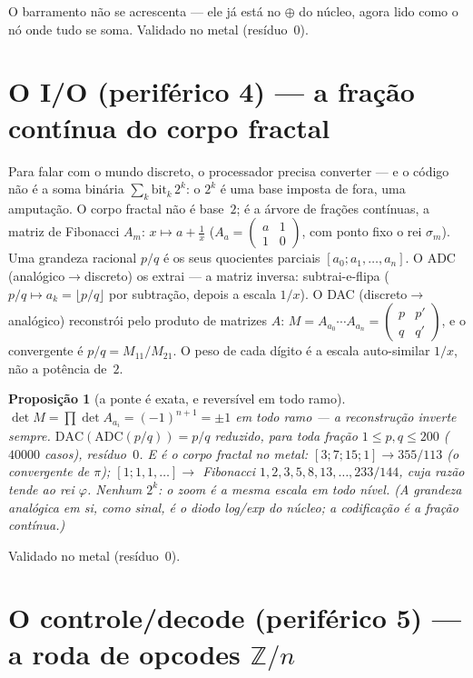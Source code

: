 \documentclass[11pt,a4paper]{article}
\newtheorem{proposicao}{Proposição}
\begin{document}
O barramento não se acrescenta --- ele já está no $\oplus$ do núcleo, agora lido como o nó onde tudo
se soma. Validado no metal (resíduo~$0$).

\section{O I/O (periférico 4) --- a fração contínua do corpo fractal}
\label{sec:io}

Para falar com o mundo discreto, o processador precisa converter --- e o código não é a soma
binária $\sum_{k}\mathrm{bit}_{k}\,2^{k}$: o $2^{k}$ é uma base imposta de fora, uma amputação. O corpo fractal não é
base~$2$; é a árvore de frações contínuas, a matriz de Fibonacci $A_{m}$: $x\mapsto a+\frac{1}{x}$
($A_{a}=\begin{pmatrix}a&1\\1&0\end{pmatrix}$, com ponto fixo o rei $\sigma_{m}$).
Uma grandeza racional $p/q$ é os seus quocientes parciais $[a_{0};a_{1},\ldots,a_{n}]$.
O ADC (analógico$\to$discreto) os extrai --- a matriz inversa: subtrai-e-flipa
($p/q\mapsto a_{k}=\lfloor p/q\rfloor$ por subtração, depois a escala $1/x$).
O DAC (discreto$\to$analógico) reconstrói pelo produto de matrizes $A$:
$M=A_{a_{0}}\cdots A_{a_{n}}=\begin{pmatrix}p&p'\\q&q'\end{pmatrix}$, e o convergente é $p/q=M_{11}/M_{21}$.
O peso de cada dígito é a escala auto-similar $1/x$, não a potência de~$2$.

\begin{proposicao}[a ponte é exata, e reversível em todo ramo]
$\det M=\prod\det A_{a_{i}}=(-1)^{n+1}=\pm 1$ em todo ramo --- a reconstrução inverte sempre.
$\mathrm{DAC}(\mathrm{ADC}(p/q))=p/q$ reduzido, para toda fração $1\le p,q\le 200$ ($40000$ casos), resíduo~$0$.
E é o corpo fractal no metal: $[3;7;15;1]\to 355/113$ (o convergente de $\pi$);
$[1;1,1,\ldots]\to$ Fibonacci $1,2,3,5,8,13,\ldots,233/144$, cuja razão tende ao rei $\varphi$.
Nenhum $2^{k}$: o zoom é a mesma escala em todo nível.
(A grandeza analógica em si, como sinal, é o diodo log/exp do núcleo; a codificação é a fração contínua.)
\end{proposicao}

Validado no metal (resíduo~$0$).

\section{O controle/decode (periférico 5) --- a roda de opcodes $\mathbb{Z}/n$}
\end{document}
